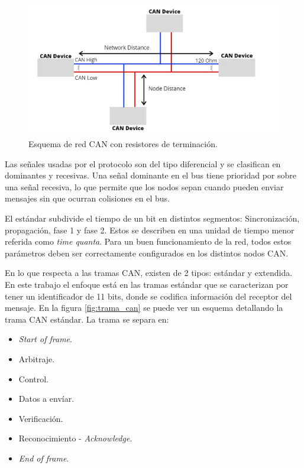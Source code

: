 \begin{figure}[h!]
	\centering
	\includegraphics[scale=.5]{./Figures/canBus.png}
	\caption{Esquema de red CAN con resistores de terminación\protect\footnotemark .}
	\label{fig:red_can_con_resistores}
\end{figure}



Las señales usadas por el protocolo son del tipo diferencial y se clasifican en dominantes y recesivas. Una señal dominante en el bus tiene prioridad por sobre una señal recesiva, lo que permite que los nodos sepan cuando pueden enviar mensajes sin que ocurran colisiones en el bus\citep{Embedded_Networking_CAN}.

El estándar subdivide el tiempo de un bit en distintos segmentos: Sincronización, propagación, fase 1 y fase 2. Estos se describen en una unidad de tiempo menor referida como \textit{time quanta}. Para un buen funcionamiento de la red, todos estos parámetros deben ser correctamente configurados en los distintos nodos CAN.

En lo que respecta a las tramas CAN, existen de 2 tipos: estándar y extendida. En este trabajo el enfoque está en las tramas estándar que se caracterizan por tener un identificador de 11 bits, donde se codifica información del receptor del mensaje. En la figura \ref{fig:trama_can} \citep{can_trama_web} se puede ver un esquema detallando la trama CAN estándar. La trama se separa en:

\begin{itemize}
	\item \textit{Start of frame}.
	\item Arbitraje.
	\item Control.
	\item Datos a envíar.
	\item Verificación.
	\item Reconocimiento - \textit{Acknowledge}.
	\item \textit{End of frame}.
\end{itemize} 

